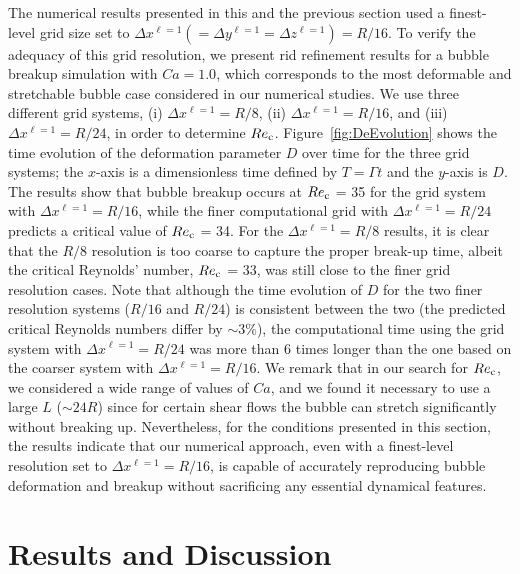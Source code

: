 \documentclass{elsarticle}
\begin{document}
The numerical results presented in this and the previous section used a finest-level grid size set to $\Delta x^{\ell=1}(= \Delta y^{\ell=1}= \Delta z^{\ell=1})=R/16$. To verify the adequacy of this grid resolution, we present rid refinement results for a bubble breakup simulation with $Ca=1.0$, which corresponds to the most deformable and stretchable bubble case considered in our numerical studies. We use three different grid systems, (i) $\Delta x^{\ell=1}=R/8$, (ii) $\Delta x^{\ell=1}=R/16$, and (iii) $\Delta x^{\ell=1}=R/24$, in order to determine $Re_{\rm c}$.  Figure~\ref{fig:DeEvolution} shows the time evolution of the deformation parameter $D$ over time for the three grid systems; the $x$-axis is a dimensionless time defined by $T=\mathit{\Gamma} t$ and the $y$-axis is $D$.  The results show that bubble breakup occurs at $Re_{\rm c}$ = 35 for the grid system with $\Delta x^{\ell=1}=R/16$, while the finer computational grid with $\Delta x^{\ell=1}=R/24$ predicts a critical value of $Re_{\rm c}$ = 34.  For the $\Delta x^{\ell=1}=R/8$ results, it is clear that the $R/8$ resolution is too coarse to capture the proper break-up time, albeit the critical Reynolds' number, $Re_{\rm c}$ = 33, was still close to the finer grid resolution cases.  Note that although the time evolution of $D$ for the two finer resolution systems ($R/16$ and $R/24$) is consistent between the two (the predicted critical Reynolds numbers differ by $\sim 3\%$), the computational time using the grid system with $\Delta x^{\ell=1}=R/24$ was more than 6 times longer than the one based on the coarser system with $\Delta x^{\ell=1}=R/16$.  We remark that in our search for $Re_{\rm c}$, we considered a wide range of values of $Ca$, and we found it necessary to use a large $L$ ($\sim 24R$) since for certain shear flows the bubble can stretch significantly without breaking up.  Nevertheless, for the conditions presented in this section, the results indicate that our numerical approach, even with a finest-level resolution set to $\Delta x^{\ell=1}=R/16$, is capable of accurately reproducing bubble deformation and breakup without sacrificing any essential dynamical features.

\section{Results and Discussion}
\end{document}
